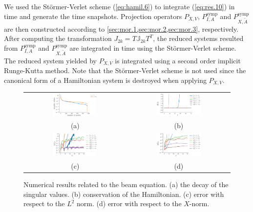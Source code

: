 We used the St\"ormer-Verlet scheme (\ref{eq:hamil.6}) to integrate (\ref{eq:res.10}) in time and generate the time snapshots. Projection operators $P_{X,V}$, $P^{\text{symp}}_{I,A}$ and $P^{\text{symp}}_{X,\tilde A}$ are then constructed according to \cref{sec:mor.1,sec:mor.2,sec:mor.3}, respectively. After computing the transformation $J_{2k} = T \mathbb J_{2k} T^T$, the reduced systems resulted from $P^{\text{symp}}_{I,A}$ and $P^{\text{symp}}_{X,\tilde A}$ are integrated in time using the St\"ormer-Verlet scheme. The reduced system yielded by $P_{X,V}$ is integrated using a second order implicit Runge-Kutta method. Note that the St\"ormer-Verlet scheme is not used since the canonical form of a Hamiltonian system is destroyed when applying $P_{X,V}$.

\begin{figure} \label{fig:1}
\begin{tabular}{cc}
\includegraphics[width=0.45\textwidth]{./figs/beam/singulars} & \includegraphics[width=0.45\textwidth]{./figs/beam/energy} \\
(a) & (b) \\
\includegraphics[width=0.45\textwidth]{./figs/beam/l2_norm} & \includegraphics[width=0.45\textwidth]{./figs/beam/energy_norm} \\
(c) & (d) \\
\end{tabular}
\caption{Numerical results related to the beam equation. (a) the decay of the singular values. (b) conservation of the Hamiltonian. (c) error with respect to the $L^2$ norm. (d) error with respect to the $X$-norm.}
\end{figure}


